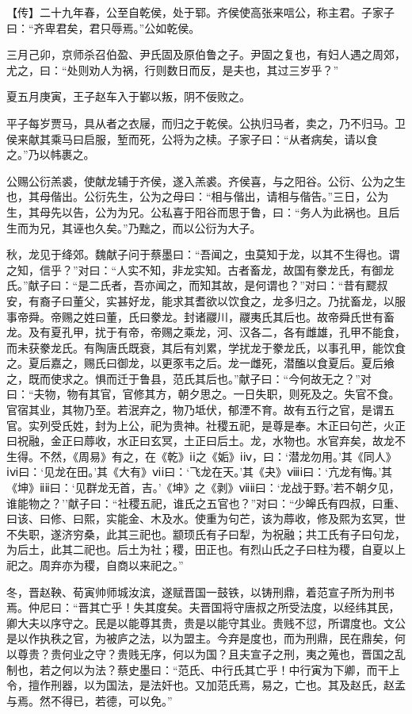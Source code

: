 \documentclass[]{article}
\begin{document}
【传】二十九年春，公至自乾侯，处于郓。齐侯使高张来唁公，称主君。子家子曰：``齐卑君矣，君只辱焉。''公如乾侯。

三月己卯，京师杀召伯盈、尹氏固及原伯鲁之子。尹固之复也，有妇人遇之周郊，尤之，曰：``处则劝人为祸，行则数日而反，是夫也，其过三岁乎？''

夏五月庚寅，王子赵车入于鄻以叛，阴不佞败之。

平子每岁贾马，具从者之衣屦，而归之于乾侯。公执归马者，卖之，乃不归马。卫侯来献其乘马曰启服，堑而死，公将为之椟。子家子曰：``从者病矣，请以食之。''乃以帏裹之。

公赐公衍羔裘，使献龙辅于齐侯，遂入羔裘。齐侯喜，与之阳谷。公衍、公为之生也，其母偕出。公衍先生，公为之母曰：``相与偕出，请相与偕告。''三日，公为生，其母先以告，公为为兄。公私喜于阳谷而思于鲁，曰：``务人为此祸也。且后生而为兄，其诬也久矣。''乃黜之，而以公衍为大子。

秋，龙见于绛郊。魏献子问于蔡墨曰：``吾闻之，虫莫知于龙，以其不生得也。谓之知，信乎？''对曰：``人实不知，非龙实知。古者畜龙，故国有豢龙氏，有御龙氏。''献子曰：``是二氏者，吾亦闻之，而知其故，是何谓也？''对曰：``昔有飂叔安，有裔子曰董父，实甚好龙，能求其耆欲以饮食之，龙多归之。乃扰畜龙，以服事帝舜。帝赐之姓曰董，氏曰豢龙。封诸鬷川，鬷夷氏其后也。故帝舜氏世有畜龙。及有夏孔甲，扰于有帝，帝赐之乘龙，河、汉各二，各有雌雄，孔甲不能食，而未获豢龙氏。有陶唐氏既衰，其后有刘累，学扰龙于豢龙氏，以事孔甲，能饮食之。夏后嘉之，赐氏曰御龙，以更豕韦之后。龙一雌死，潜醢以食夏后。夏后飨之，既而使求之。惧而迁于鲁县，范氏其后也。''献子曰：``今何故无之？''对曰：``夫物，物有其官，官修其方，朝夕思之。一日失职，则死及之。失官不食。官宿其业，其物乃至。若泯弃之，物乃坻伏，郁湮不育。故有五行之官，是谓五官。实列受氏姓，封为上公，祀为贵神。社稷五祀，是尊是奉。木正曰句芒，火正曰祝融，金正曰蓐收，水正曰玄冥，土正曰后土。龙，水物也。水官弃矣，故龙不生得。不然，《周易》有之，在《乾》ⅰⅰ之《姤》ⅰⅳ，曰：`潜龙勿用。'其《同人》ⅰⅵ曰：`见龙在田。'其《大有》ⅵⅰ曰：`飞龙在天。'其《夬》ⅷⅰ曰：`亢龙有悔。'其《坤》ⅱⅱ曰：`见群龙无首，吉。'《坤》之《剥》ⅶⅱ曰：`龙战于野。'若不朝夕见，谁能物之？''献子曰：``社稷五祀，谁氏之五官也？''对曰：``少皞氏有四叔，曰重、曰该、曰修、曰熙，实能金、木及水。使重为句芒，该为蓐收，修及熙为玄冥，世不失职，遂济穷桑，此其三祀也。颛顼氏有子曰犁，为祝融；共工氏有子曰句龙，为后土，此其二祀也。后土为社；稷，田正也。有烈山氏之子曰柱为稷，自夏以上祀之。周弃亦为稷，自商以来祀之。''

冬，晋赵鞅、荀寅帅师城汝滨，遂赋晋国一鼓铁，以铸刑鼎，着范宣子所为刑书焉。仲尼曰：``晋其亡乎！失其度矣。夫晋国将守唐叔之所受法度，以经纬其民，卿大夫以序守之。民是以能尊其贵，贵是以能守其业。贵贱不愆，所谓度也。文公是以作执秩之官，为被庐之法，以为盟主。今弃是度也，而为刑鼎，民在鼎矣，何以尊贵？贵何业之守？贵贱无序，何以为国？且夫宣子之刑，夷之蒐也，晋国之乱制也，若之何以为法？蔡史墨曰：``范氏、中行氏其亡乎！中行寅为下卿，而干上令，擅作刑器，以为国法，是法奸也。又加范氏焉，易之，亡也。其及赵氏，赵孟与焉。然不得已，若德，可以免。''
\end{document}
